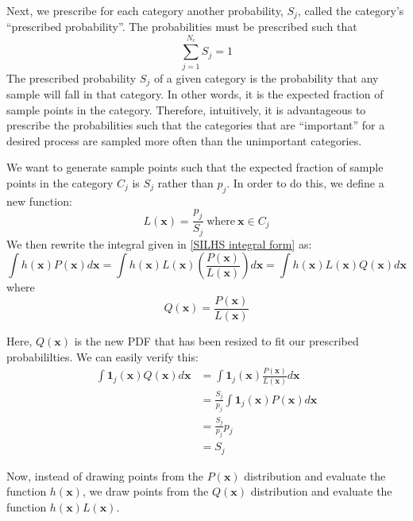 \documentclass[11pt,fleqn]{article}
\begin{document}
Next, we prescribe for each category another probability, $S_j$, called the
category's ``prescribed probability''. The probabilities must be prescribed such
that
\begin{equation}
\sum_{j=1}^{N_c} S_j = 1
\end{equation}
The prescribed probability $S_j$ of a given category is the probability that any
sample will fall in that category. In other words, it is the expected fraction
of sample points in the category. Therefore, intuitively, it is advantageous to
prescribe the probabilities such that the categories that are ``important'' for
a desired process are sampled more often than the unimportant categories.

We want to generate sample points such that the expected fraction of sample
points in the category $C_j$ is $S_j$ rather than $p_j$. In order to do this,
we define a new function:
\begin{equation}
L(\mathbf{x}) = \frac{p_j}{S_j}\ \mathrm{where}\ \mathbf{x}\in C_j
\end{equation}
We then rewrite the integral given in \eqref{SILHS integral form} as:
\begin{equation}
\int h(\mathbf{x}) P(\mathbf{x}) d\mathbf{x} =
\int h(\mathbf{x}) L(\mathbf{x})\left(\frac{P(\mathbf{x})}{L(\mathbf{x})}
\right)d\mathbf{x} =
\int h(\mathbf{x}) L(\mathbf{x}) Q(\mathbf{x}) d\mathbf{x}
\label{SILHS integral rewrite}
\end{equation}
where
\begin{equation}
Q(\mathbf{x}) = \frac{P(\mathbf{x})}{L(\mathbf{x})}
\end{equation}

Here, $Q(\mathbf{x})$ is the new PDF that has been resized to fit our prescribed
probabililties. We can easily verify this:
\begin{align}
\int \mathbf{1}_j(\mathbf{x}) Q(\mathbf{x}) d\mathbf{x} &=
\int \mathbf{1}_j(\mathbf{x}) \frac{P(\mathbf{x})}{L(\mathbf{x})} d\mathbf{x} \\
 &= \frac{S_j}{p_j} \int \mathbf{1}_j(\mathbf{x}) P(\mathbf{x}) d\mathbf{x} \\
 &= \frac{S_j}{p_j} p_j \\
 &= S_j
\end{align}

Now, instead of drawing points from the $P(\mathbf{x})$ distribution and
evaluate the function $h(\mathbf{x})$, we draw points from the $Q(\mathbf{x})$
distribution and evaluate the function $h(\mathbf{x}) L(\mathbf{x})$.
\end{document}
